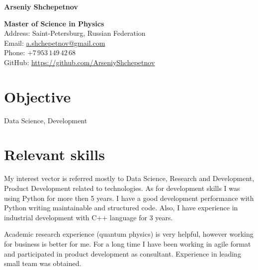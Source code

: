 \documentclass[10pt,a4paper]{article}
\newcommand{\vacancyName}{PhD student}
\begin{document}
	

	\raggedright{\Large{\textbf{Arseniy Shchepetnov}}}\\[0.3cm]
	
	\begin{minipage}[t]{0.7\textwidth}
		\vspace{0pt}
		\raggedright{\textbf{Master of Science in Physics}}\\[0.3cm]
		\noindent Address: Saint-Petersburg, Russian Federation \\[0.1cm]
		\noindent Email: \href{mailto:a.shchepetnov@gmail.com}{a.shchepetnov@gmail.com}\\[0.1cm]
		\noindent Phone: $+7\,953\,149\,42\,68$ \\
		\noindent GitHub: \href{https://github.com/ArseniyShchepetnov}{https://github.com/ArseniyShchepetnov}
	\end{minipage}
	\begin{minipage}[t]{0.2\textwidth}
		\vspace{0pt}
	\end{minipage}
	
	
	\section*{Objective}
	
	Data Science, Development
	
	\section*{Relevant skills}
	
	\setlength{\parindent}{3em}

	
	My interest vector is referred mostly to Data Science, Research and Development, Product Development related to technologies.
	As for development skills I was using Python for more then 5 years.
	I have a good development performance with Python writing maintainable and structured code. Also, I have experience in industrial development with C++ language for 3 years.
	
	
	Academic research experience (quantum physics) is very helpful, however working for business is better for me.
	For a long time I have been working in agile format and participated in product development as consultant.
	Experience in leading small team was obtained.
\end{document}
